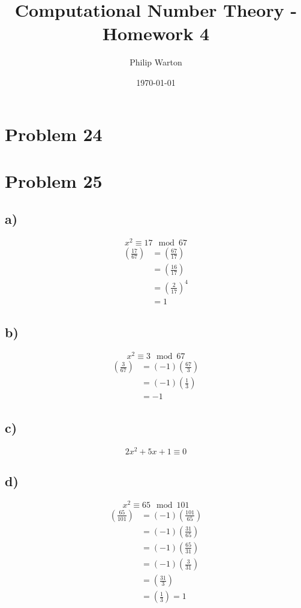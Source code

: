\documentclass{article}
\theoremstyle{definition}
\begin{document}
\title{Computational Number Theory - Homework 4}
\author{Philip Warton}
\date{\today}
\maketitle
\section*{Problem 24}
\section*{Problem 25}
\subsection*{a)}
\[
    x^2 \equiv 17 \mod{67}
\]
\begin{align}
    \left(\frac{17}{67}\right) & = \left(\frac{67}{17}\right)\\
    & = \left(\frac{16}{17}\right) \\
    & = \left(\frac{2}{17}\right)^4 \\
    & = 1
\end{align}
\subsection*{b)}
\[
    x^2 \equiv 3 \mod{67}
\]
\begin{align}
    \left(\frac{3}{67}\right)
    & = (-1)\left(\frac{67}{3}\right) \\
    & = (-1)\left(\frac{1}{3}\right) \\
    & = -1
\end{align}
\subsection*{c)}
\[
    2x^2 + 5x + 1 \equiv 0   
\]
\subsection*{d)}
\[
    x^2 \equiv 65 \mod{101}    
\]
\begin{align}
    \left(\frac{65}{101}\right) 
    & = (-1)\left(\frac{101}{65}\right)\\
    & = (-1)\left(\frac{31}{65}\right)\\
    & = (-1)\left(\frac{65}{31}\right)\\
    & = (-1)\left(\frac{3}{31}\right)\\
    & = \left(\frac{31}{3}\right)\\
    & = \left(\frac{1}{3}\right) = 1
\end{align}
\end{document}
